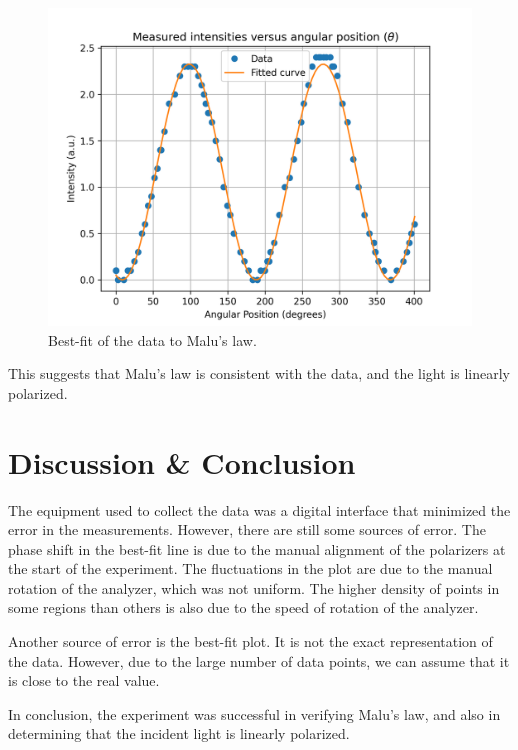 \documentclass[10pt]{article}
\begin{document}
\begin{figure}[h!]
  \centering
  \includegraphics[scale=0.6]{plots/plot2.png}
  \caption{Best-fit of the data to Malu's law.}
  \label{fig:3}
\end{figure}

This suggests that Malu's law is consistent with the data, and the light is linearly polarized. 
 
\section{Discussion \& Conclusion}

The equipment used to collect the data was a digital interface that minimized the error in the measurements. However, there are still some sources of error. The phase shift in the best-fit line is due to the manual alignment of the polarizers at the start of the experiment. The fluctuations in the plot are due to the manual rotation of the analyzer, which was not uniform. The higher density of points in some regions than others is also due to the speed of rotation of the analyzer.

Another source of error is the best-fit plot. It is not the exact representation of the data. However, due to the large number of data points, we can assume that it is close to the real value.

In conclusion, the experiment was successful in verifying Malu's law, and also in determining that the incident light is linearly polarized.

\printbibliography
\end{document}
